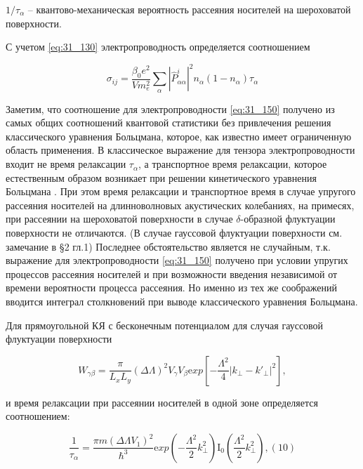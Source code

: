 \noindent ${1}/{{\tau }_{\alpha }}$ -- квантово-механическая вероятность рассеяния носителей на шероховатой поверхности.

 С учетом \eqref{eq:31_130} электропроводность определяется соотношением

\begin{equation} \label{eq:31_150}
{\sigma }_{ij}=\frac{{\beta }_0e^2}{Vm^2_e}\sum_{\alpha }{{\left|{\hat{P}}^i_{\alpha \alpha }\right|}^2n_{\alpha }\left(1-n_{\alpha }\right)}{\tau }_{\alpha }
\end{equation}

\noindent Заметим, что соотношение для электропроводности \eqref{eq:31_150} получено из самых общих соотношений квантовой статистики без привлечения решения классического уравнения Больцмана, которое, как известно имеет ограниченную область применения. В классическое выражение для тензора электропроводности входит не время релаксации ${\tau }_{\alpha }$, а транспортное время релаксации, которое естественным образом возникает при решении кинетического уравнения Больцмана \cite{Anselm1978}. При этом время релаксации и транспортное время в случае упругого рассеяния носителей на длинноволновых акустических колебаниях, на примесях, при рассеянии на шероховатой поверхности в случае $\delta $-образной флуктуации поверхности не отличаются. (В случае гауссовой флуктуации поверхности см. замечание в \S 2 гл.1) Последнее обстоятельство является не случайным, т.к. выражение для электропроводности \eqref{eq:31_150} получено при условии упругих процессов рассеяния носителей и при возможности введения независимой от времени вероятности процесса рассеяния. Но именно из тех же соображений вводится интеграл столкновений при выводе классического уравнения Больцмана.

Для прямоугольной КЯ с бесконечным потенциалом для случая гауссовой флуктуации поверхности

\begin{equation} \label{eq:31_160}
W_{\gamma \beta } =\frac{\pi }{L_{x} L_{y} } (\Delta \Lambda )^{2} V_{\gamma } V_{\beta } {\mathrm exp}\left[-\frac{\Lambda ^{2} }{4} \left|k_{\bot } -k'_{\bot } \right|^{2} \right],
\end{equation}

\noindent и время релаксации при рассеянии носителей в одной зоне определяется соотношением:

\begin{equation} \label{eq:31_170}
\frac{1}{\tau _{\alpha } } =\frac{\pi m(\Delta \Lambda V_{1} )^{2} }{\hbar ^{3} } {\mathrm exp}\left(-\frac{\Lambda ^{2} }{2} k_{\bot }^{2} \right){\mathrm I}_{{\mathrm 0}} \left(\frac{\Lambda ^{2} }{2} k_{\bot }^{2} \right),   (10)
\end{equation}

